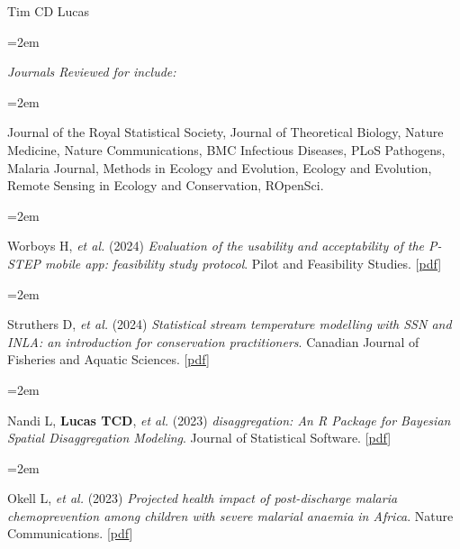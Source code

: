 \documentclass{scrartcl}
\newcommand{\MarginText}[1]{\marginpar{\raggedleft\itshape\small#1}} %
\newcommand{\Description}[1]{\hangindent=2em\hangafter=0\noindent\raggedright\footnotesize{#1}\par\normalsize\vspace{1em}} %
\begin{document}
\begin{cv}{Tim {\Large CD} Lucas}

\vspace{1em} %
{\color{Maroon}}\vspace{1em}

\Description{\MarginText{Peer Review}\emph{Journals Reviewed for include:}}

\vspace{-0.5em} %


\Description{Journal of the Royal Statistical Society, Journal of Theoretical Biology, Nature Medicine, Nature Communications, BMC Infectious Diseases, PLoS Pathogens, Malaria Journal, Methods in Ecology and Evolution, Ecology and Evolution, Remote Sensing in Ecology and Conservation, ROpenSci.}




\vspace{1em} %

{\color{Maroon}}\vspace{1em}



\Description{\MarginText{2024}Worboys H, \emph{et al.} (2024) \emph{Evaluation of the usability and acceptability of the P-STEP mobile app: feasibility study protocol}.  Pilot and Feasibility Studies. [\href{https://link.springer.com/article/10.1186/s40814-024-01546-9}{pdf}]}


\Description{Struthers D, \emph{et al.} (2024) \emph{Statistical stream temperature modelling with SSN and INLA: an introduction for conservation practitioners}. Canadian Journal of Fisheries and Aquatic Sciences. [\href{https://cdnsciencepub.com/doi/full/10.1139/cjfas-2023-0136}{pdf}]}


\Description{\MarginText{2023}Nandi L, \textbf{Lucas TCD}, \emph{et al.} (2023) \emph{disaggregation: An R Package for Bayesian Spatial Disaggregation Modeling}. Journal of Statistical Software. [\href{https://www.jstatsoft.org/article/view/v106i11}{pdf}]}

\Description{Okell L, \emph{et al.} (2023) \emph{Projected health impact of post-discharge malaria chemoprevention among children with severe malarial anaemia in Africa}. Nature Communications. [\href{https://www.nature.com/articles/s41467-023-35939-w}{pdf}]}



\end{cv}
\end{document}
